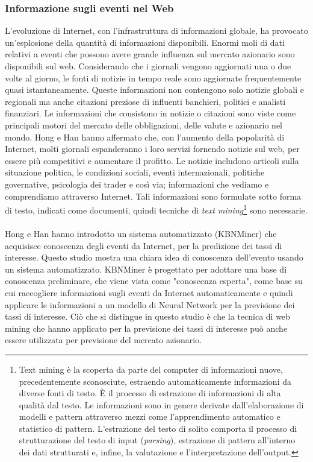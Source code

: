 \documentclass[a4paper,12pt]{report}
\begin{document}
\subsubsection{Informazione sugli eventi nel Web}
L'evoluzione di Internet, con l'infrastruttura di informazioni globale, ha provocato un'esplosione della quantità di informazioni disponibili. Enormi moli di dati relativi a eventi che possono avere grande influenza sul mercato azionario sono disponibili sul web. Considerando che i giornali vengono aggiornati una o due volte al giorno, le fonti di notizie in tempo reale sono aggiornate frequentemente quasi istantaneamente. Queste informazioni non contengono solo notizie globali e regionali ma anche citazioni preziose di influenti banchieri, politici e analisti finanziari. Le informazioni che consistono in notizie o citazioni sono viste come principali motori del mercato delle obbligazioni, delle valute e azionario nel mondo. Hong e Han \cite{13} hanno affermato che, con l'aumento della popolarità di Internet, molti giornali espanderanno i loro servizi fornendo notizie sul web, per essere più competitivi e aumentare il profitto. Le notizie includono articoli sulla situazione politica, le condizioni sociali, eventi internazionali, politiche governative, psicologia dei trader e così via; informazioni che vediamo e comprendiamo attraverso Internet. Tali informazioni sono formulate sotto forma di testo, indicati come documenti, quindi tecniche di \textit{text mining}\footnote{Text mining è la scoperta da parte del computer di informazioni nuove, precedentemente sconosciute, estraendo automaticamente informazioni da diverse fonti di testo.	È il processo di estrazione di informazioni di alta qualità dal testo. Le informazioni sono in genere derivate dall'elaborazione di modelli e pattern attraverso mezzi come l'apprendimento automatico e statistico di pattern. L'estrazione del testo di solito comporta il processo di strutturazione del testo di input (\textit{parsing}), estrazione di pattern all'interno dei dati strutturati e, infine, la valutazione e l'interpretazione dell'output.} sono necessarie.\\~\\
Hong e Han \cite{13} hanno introdotto un sistema automatizzato (KBNMiner) che acquisisce conoscenza degli eventi da Internet, per la predizione dei tassi di interesse. Questo studio
mostra una chiara idea di conoscenza dell'evento usando un sistema automatizzato. KBNMiner è progettato per adottare una base di conoscenza preliminare, che viene vista come "conoscenza esperta", come base su cui raccogliere informazioni sugli eventi da Internet automaticamente e quindi applicare le informazioni a un modello di Neural Network per la previsione dei tassi di interesse. Ciò che si distingue in questo studio è che la tecnica di web mining che hanno applicato per la previsione dei tassi di interesse può anche essere utilizzata per previsione del mercato azionario.
\end{document}
